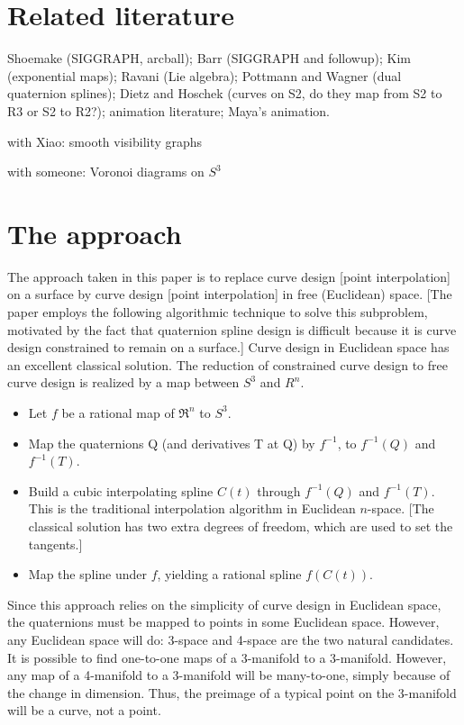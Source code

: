 \documentclass[12pt]{article}
\begin{document}
\clearpage

\section{Related literature}

Shoemake (SIGGRAPH, arcball); Barr (SIGGRAPH and followup);
Kim (exponential maps); Ravani (Lie algebra);
Pottmann and Wagner (dual quaternion splines);
Dietz and Hoschek (curves on S2, do they map from S2 to R3 or S2 to R2?);
animation literature;  Maya's animation.

with Xiao: smooth visibility graphs

with someone: Voronoi diagrams on $S^3$

\clearpage

\section{The approach}

\noindent 
The approach taken in this paper is to replace curve design [point interpolation] 
on a surface by curve design [point interpolation] in free (Euclidean) space.
[The paper employs the following algorithmic technique to solve this subproblem,
motivated by the fact that quaternion spline design is difficult because it is
curve design constrained to remain on a surface.]
Curve design in Euclidean space has an excellent classical solution.
The reduction of constrained curve design to free curve design
is realized by a map between $S^3$ and $R^n$.
%
\begin{itemize}
\item Let $f$ be a rational map of $\Re^n$ to $S^3$.
\item Map the quaternions Q (and derivatives T at Q) by $f^{-1}$, 
      to $f^{-1}(Q)$ and $f^{-1}(T)$.
\item Build a cubic interpolating spline $C(t)$ 
      through $f^{-1}(Q)$ and $f^{-1}(T)$.
      This is the traditional interpolation algorithm in Euclidean $n$-space.
      [The classical solution has two extra degrees of freedom, 
      which are used to set the tangents.]
\item Map the spline under $f$, yielding a rational spline $f(C(t))$.
\end{itemize}

Since this approach relies on the simplicity of curve design in Euclidean space,
the quaternions must be mapped to points in some Euclidean space.
However, any Euclidean space will do: 3-space and 4-space are the two natural candidates.
It is possible to find one-to-one maps of a 3-manifold to a 3-manifold.
However, any map of a 4-manifold to a 3-manifold will be many-to-one,
simply because of the change in dimension.
Thus, the preimage of a typical point on the 3-manifold will be a curve,
not a point.
\end{document}
